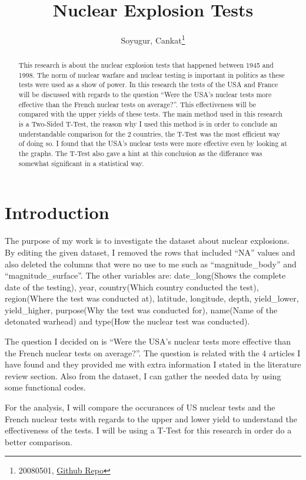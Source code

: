 \documentclass[
  12pt,
]{article}
\title{Nuclear Explosion Tests}
\author{Soyugur, Cankat\footnote{20080501, \href{https://github.com/cnktxd/Final.git}{Github Repo}}}
\date{}
\begin{document}
\maketitle
\begin{abstract}
This research is about the nuclear explosion tests that happened between 1945 and 1998. The norm of nuclear warfare and nuclear testing is important in politics as these tests were used as a show of power. In this research the tests of the USA and France will be discussed with regards to the question ``Were the USA's nuclear tests more effective than the French nuclear tests on average?''. This effectiveness will be compared with the upper yields of these tests. The main method used in this research is a Two-Sided T-Test, the reason why I used this method is in order to conclude an understandable comparison for the 2 countries, the T-Test was the most efficient way of doing so. I found that the USA's nuclear tests were more effective even by looking at the graphs. The T-Test also gave a hint at this conclusion as the differance was somewhat significant in a statistical way.
\end{abstract}

\hypertarget{introduction}{%
\section{Introduction}\label{introduction}}

The purpose of my work is to investigate the dataset about nuclear explosions. By editing the given dataset, I removed the rows that included ``NA'' values and also deleted the columns that were no use to me such as ``magnitude\_body'' and ``magnitude\_surface''. The other variables are: date\_long(Shows the complete date of the testing), year, country(Which country conducted the test), region(Where the test was conducted at), latitude, longitude, depth, yield\_lower, yield\_higher, purpose(Why the test was conducted for), name(Name of the detonated warhead) and type(How the nuclear test was conducted).

The question I decided on is ``Were the USA's nuclear tests more effective than the French nuclear tests on average?''. The question is related with the 4 articles I have found and they provided me with extra information I stated in the literature review section. Also from the dataset, I can gather the needed data by using some functional codes.

For the analysis, I will compare the occurances of US nuclear tests and the French nuclear tests with regards to the upper and lower yield to understand the effectiveness of the tests. I will be using a T-Test for this research in order do a better comparison.
\end{document}
